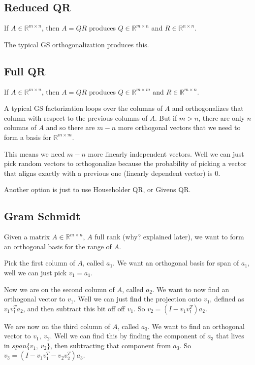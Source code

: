 \documentclass{article}
\theoremstyle{definition}
\begin{document}
\subsection{Reduced QR}
If $A \in \mathbb{R}^{m \times n}$, then $A = QR$ produces $Q \in \mathbb{R}^{m \times n}$ and $R \in \mathbb{R}^{n \times n}$.

The typical GS orthogonalization produces this.

\subsection{Full QR}
If $A \in \mathbb{R}^{m \times n}$, then $A = QR$ produces $Q \in \mathbb{R}^{m \times m}$ and $R \in \mathbb{R}^{m \times n}$.

A typical GS factorization loops over the columns of $A$ and orthogonalizes that column with respect to the previous columns of $A$. But if $m > n$, there are only $n$ columns of $A$ and so there are $m-n$ more orthogonal vectors that we need to form a basis for $\mathbb{R}^{m \times m}$.

This means we need $m-n$ more linearly independent vectors. Well we can just pick random vectors to orthogonalize because the probability of picking a vector that aligns exactly with a previous one (linearly dependent vector) is $0$.

Another option is just to use Householder QR, or Givens QR.

\subsection{Gram Schmidt}

Given a matrix $A \in \mathbb{R}^{m \times n}$, $A$ full rank (why? explained later), we want to form an orthogonal basis for the range of $A$.

Pick the first column of $A$, called $a_1$. We want an orthogonal basis for span of $a_1$, well we can just pick $v_1 = a_1$.

Now we are on the second column of $A$, called $a_2$. We want to now find an orthogonal vector to $v_1$. Well we can just find the projection onto $v_1$, defined as $v_1 v_1^T a_2$, and then subtract this bit off off $v_1$. So $v_2 = (I - v_1 v_1^T) a_2$.

We are now on the third column of $A$, called $a_3$. We want to find an orthogonal vector to $v_1,\ v_2$. Well we can find this by finding the component of $a_3$ that lives in $span\{v_1,\ v_2\}$, then subtracting that component from $a_3$. So $v_3 = (I - v_1 v_1^T - v_2 v_2^T) a_3$.
\end{document}
